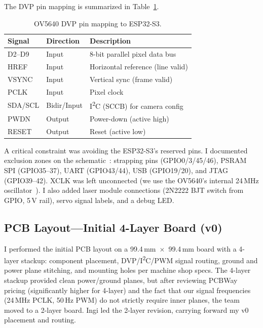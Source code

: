 \documentclass[12pt]{article}
\begin{document}
The DVP pin mapping is summarized in Table~\ref{tab:dvp_pins}.

\begin{table}[H]
  \centering
  \caption{OV5640 DVP pin mapping to ESP32-S3.}
  \label{tab:dvp_pins}
  \begin{tabular}{llp{7cm}}
    \toprule
    Signal & Direction & Description \\
    \midrule
    D2--D9 & Input & 8-bit parallel pixel data bus \\
    HREF   & Input & Horizontal reference (line valid) \\
    VSYNC  & Input & Vertical sync (frame valid) \\
    PCLK   & Input & Pixel clock \\
    SDA/SCL & Bidir/Input & I\textsuperscript{2}C (SCCB) for camera config \\
    PWDN   & Output & Power-down (active high) \\
    RESET  & Output & Reset (active low) \\
    \bottomrule
  \end{tabular}
\end{table}

A critical constraint was avoiding the ESP32-S3's reserved pins.  I
documented exclusion zones on the schematic~\cite{espidf}: strapping pins
(GPIO0/3/45/46), PSRAM SPI (GPIO35--37), UART (GPIO43/44), USB (GPIO19/20),
and JTAG (GPIO39--42).  XCLK was left unconnected (we use the OV5640's
internal 24\,MHz oscillator~\cite{adafruit_ov5640}).  I also added laser
module connections (2N2222 BJT switch from GPIO, 5\,V rail), servo signal
labels, and a debug LED.

\subsection{PCB Layout---Initial 4-Layer Board (v0)}

I performed the initial PCB layout on a 99.4\,mm~$\times$~99.4\,mm board
with a 4-layer stackup: component placement, DVP/I\textsuperscript{2}C/PWM
signal routing, ground and power plane stitching, and mounting holes per
machine shop specs.  The 4-layer stackup provided clean power/ground planes,
but after reviewing PCBWay pricing (significantly higher for 4-layer) and
the fact that our signal frequencies (24\,MHz PCLK, 50\,Hz PWM) do not
strictly require inner planes, the team moved to a 2-layer board.  Ingi led
the 2-layer revision, carrying forward my v0 placement and routing.
\end{document}
